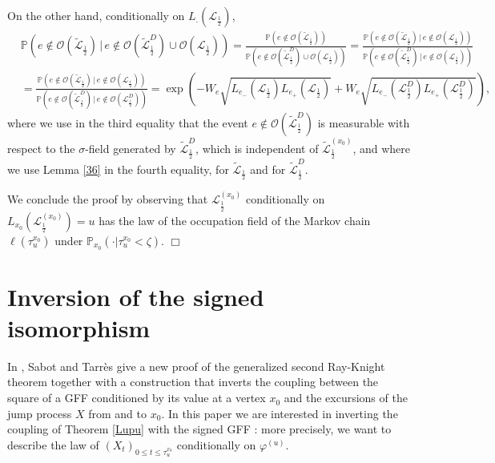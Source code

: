 \documentclass[11pt,a4paper]{amsart}
\numberwithin{equation}{section}
\begin{document}
On the other hand, conditionally on $L_.(\mathcal{L}_{\frac{1}{2}})$,
\begin{align*}
&\mathbb{P}(e\not\in\mathcal{O}(\tilde{\mathcal{L}}_{\frac{1}{2}})\,|\,
e\not\in\mathcal{O}(\tilde{\mathcal{L}}_{\frac{1}{2}}^D)\cup\mathcal{O}(\mathcal{L}_{\frac{1}{2}}))
=\frac{\mathbb{P}(e\not\in\mathcal{O}(\tilde{\mathcal{L}}_{\frac{1}{2}}))}{\mathbb{P}(e\not\in\mathcal{O}(\tilde{\mathcal{L}}_{\frac{1}{2}}^D)\cup\mathcal{O}(\mathcal{L}_{\frac{1}{2}}))}=
\frac{\mathbb{P}(e\not\in\mathcal{O}(\tilde{\mathcal{L}}_{\frac{1}{2}})\,|\,
e\not\in\mathcal{O}(\mathcal{L}_{\frac{1}{2}}))}{\mathbb{P}(e\not\in\mathcal{O}(\tilde{\mathcal{L}}_{\frac{1}{2}}^D)\,|\,
e\not\in\mathcal{O}(\mathcal{L}_{\frac{1}{2}}))}\\
&=\frac{\mathbb{P}(e\not\in\mathcal{O}(\tilde{\mathcal{L}}_{\frac{1}{2}})\,|\,
e\not\in\mathcal{O}(\mathcal{L}_{\frac{1}{2}}))}{\mathbb{P}(e\not\in\mathcal{O}(\tilde{\mathcal{L}}_{\frac{1}{2}}^D)\,|\,
e\not\in\mathcal{O}(\mathcal{L}_{\frac{1}{2}}^D))}
=\exp\left(-W_e\sqrt{L_{e_-}(\mathcal{L}_{\frac{1}{2}})L_{e_+}(\mathcal{L}_{\frac{1}{2}})}
+W_e\sqrt{L_{e_-}(\mathcal{L}_{\frac{1}{2}}^D)L_{e_+}(\mathcal{L}_{\frac{1}{2}}^D)}\right),
\end{align*}
where we use in the third equality that the event $e\not\in\mathcal{O}(\tilde{\mathcal{L}}_{\frac{1}{2}}^D)$ is measurable with respect to the $\sigma$-field generated by $\tilde{\mathcal{L}}_{\frac{1}{2}}^D$, which is independent of $\tilde{\mathcal{L}}_{\frac{1}{2}}^{(x_0)}$, and where we use Lemma \ref{36} in the fourth equality, for $\tilde{\mathcal{L}}_{\frac{1}{2}}$ and for $\tilde{\mathcal{L}}_{\frac{1}{2}}^D$. 

We conclude the proof by observing that  $\mathcal{L}_{\frac{1}{2}}^{(x_0)}$ conditionally on $L_{x_0}(\mathcal{L}_{\frac{1}{2}}^{(x_0)})=u$ has the law of the occupation field of the Markov chain $\ell(\tau_{u}^{x_{0}})$
under $\mathbb{P}_{x_{0}}(\cdot \vert \tau_{u}^{x_{0}}<\zeta)$.
{\hfill $\Box$}
\section{Inversion of the signed isomorphism}
\label{sec:inversion}
In \cite{SabotTarres2015RK}, Sabot and Tarrès give a new proof of the generalized second Ray-Knight theorem together with a construction that inverts the coupling between the square of a GFF conditioned by its value at a vertex $x_{0}$ and the excursions of the jump process $X$ from and to $x_{0}$. 
In this paper we are interested in inverting the coupling of Theorem \ref{Lupu} with the signed GFF : more precisely, we want to describe the law of
$(X_t)_{0\le t\le \tau_u^{x_0}}$ conditionally on $\varphi^{(u)}$. 
\end{document}
